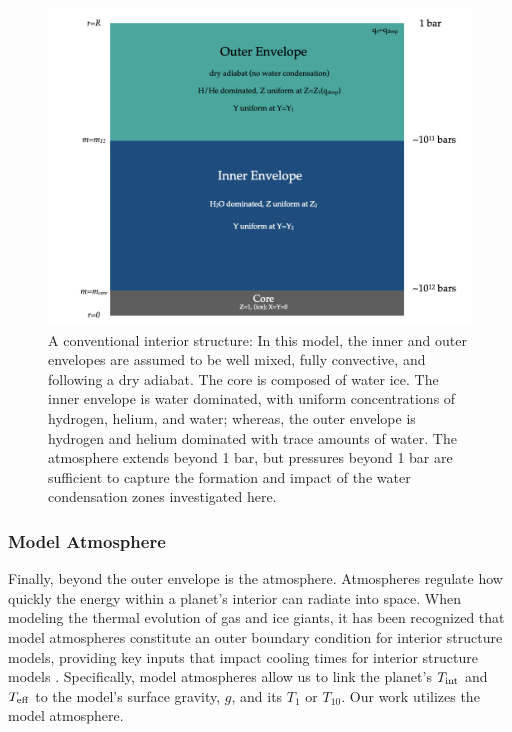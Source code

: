 \documentclass[11pt]{ucscthesisbs}
\begin{document}
\begin{figure}[ht!]
 \centerline{
  \includegraphics[width=6.0in]{figures/structure_schematic/structure_schematic.001.jpeg}
 }
\caption[A Standard Interior Structure Model]
{A conventional interior structure: In this model, the inner and outer envelopes are assumed to be well mixed, fully convective, and following a dry adiabat. The core is composed of water ice. The inner envelope is water dominated, with uniform concentrations of hydrogen, helium, and water; whereas, the outer envelope is hydrogen and helium dominated with trace amounts of water. The atmosphere extends beyond 1 bar, but pressures beyond 1 bar are sufficient to capture the formation and impact of the water condensation zones investigated here.}
\label{fig:standard_dry_interior}
\end{figure}

\subsubsection{Model Atmosphere}
Finally, beyond the outer envelope is the atmosphere. Atmospheres regulate how quickly the energy within a planet's interior can radiate into space. When modeling the thermal evolution of gas and ice giants, it has been recognized that model atmospheres constitute an outer boundary condition for interior structure models, providing key inputs that impact cooling times for interior structure models \citep{graboske_1975,fortney_2011}. Specifically, model atmospheres allow us to link the planet's $T_{\rm int}$ and $T_{\rm eff}$ to the model's surface gravity, $g$, and its $T_{1}$ or $T_{10}$. Our work utilizes the \citep{fortney_2011} model atmosphere. 
\end{document}
